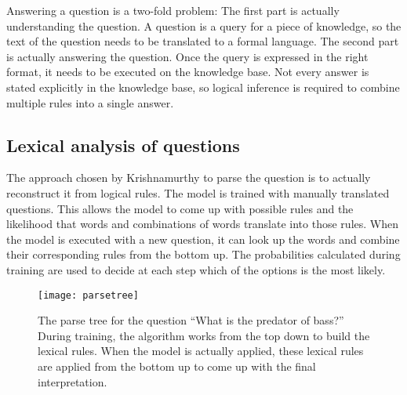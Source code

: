 Answering a question is a two-fold problem: The first part is actually understanding the question. A question is a query for a piece of knowledge, so the text of the question needs to be translated to a formal language. The second part is actually answering the question. Once the query is expressed in the right format, it needs to be executed on the knowledge base. Not every answer is stated explicitly in the knowledge base, so logical inference is required to combine multiple rules into a single answer. 
\subsection{Lexical analysis of questions}
The approach chosen by Krishnamurthy \cite{probseman} to parse the question is to actually reconstruct it from logical rules. The model is trained with manually translated questions. This allows the model to come up with possible rules and the likelihood that words and combinations of words translate into those rules. When the model is executed with a new question, it can look up the words and combine their corresponding rules from the bottom up. The probabilities calculated during training are used to decide at each step which of the options is the most likely.
\begin{figure}
\texttt{[image: parsetree]}
\caption{The parse tree for the question ``What is the predator of bass?'' During training, the algorithm works from the top down to build the lexical rules. When the model is actually applied, these lexical rules are applied from the bottom up to come up with the final interpretation.}\label{fig:parsetree}
\end{figure}
